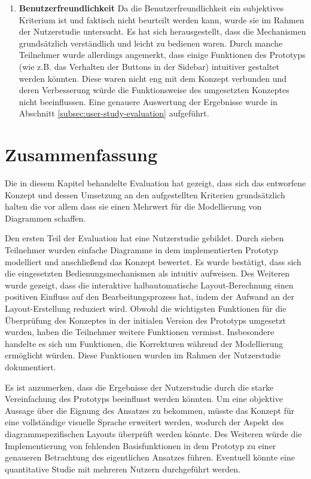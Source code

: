 \begin{enumerate}[label={K.\arabic*}]
\item
\label{eval:user-friendly}
\textbf{Benutzerfreundlichkeit}
Da die Benutzerfreundlichkeit ein subjektives Kriterium ist und faktisch nicht beurteilt werden kann, wurde sie im Rahmen der Nutzerstudie untersucht. Es hat sich herausgestellt, dass die Mechanismen grundsätzlich verständlich und leicht zu bedienen waren. Durch manche Teilnehmer wurde allerdings angemerkt, dass einige Funktionen des Prototyps (wie z.B. das Verhalten der Buttons in der Sidebar) intuitiver gestaltet werden könnten. Diese waren nicht eng mit dem Konzept verbunden und deren Verbesserung würde die Funktionsweise des umgesetzten Konzeptes nicht beeinflussen. Eine genauere Auswertung der Ergebnisse wurde in Abschnitt \ref{subsec:user-study-evaluation} aufgeführt.

\end{enumerate}

\section{Zusammenfassung}
\label{sec:evaluation-summary}

Die in diesem Kapitel behandelte Evaluation hat gezeigt, dass sich das entworfene Konzept und dessen Umsetzung an den aufgestellten Kriterien grundsätzlich halten die vor allem dass sie einen Mehrwert für die Modellierung von Diagrammen schaffen.

Den ersten Teil der Evaluation hat eine Nutzerstudie gebildet. Durch sieben Teilnehmer wurden einfache Diagramme in dem implementierten Prototyp modelliert und anschließend das Konzept bewertet. Es wurde bestätigt, dass sich die eingesetzten Bedienungsmechanismen als intuitiv aufweisen. Des Weiteren wurde gezeigt, dass die interaktive halbautomatische Layout-Berechnung einen positiven Einfluss auf den Bearbeitungsprozess hat, indem der Aufwand an der Layout-Erstellung reduziert wird. Obwohl die wichtigsten Funktionen für die Überprüfung des Konzeptes in der initialen Version des Prototyps umgesetzt wurden, haben die Teilnehmer weitere Funktionen vermisst. Insbesondere handelte es sich um Funktionen, die Korrekturen während der Modellierung ermöglicht würden. Diese Funktionen wurden im Rahmen der Nutzerstudie dokumentiert.

Es ist anzumerken, dass die Ergebnisse der Nutzerstudie durch die starke Vereinfachung des Prototyps beeinflusst werden könnten. Um eine objektive Aussage über die Eignung des Ansatzes zu bekommen, müsste das Konzept für eine vollständige visuelle Sprache erweitert werden, wodurch der Aspekt des diagrammspezifischen Layouts überprüft werden könnte. Des Weiteren würde die Implementierung von fehlenden Basisfunktionen in dem Prototyp zu einer genaueren Betrachtung des eigentlichen Ansatzes führen. Eventuell könnte eine quantitative Studie mit mehreren Nutzern durchgeführt werden.

